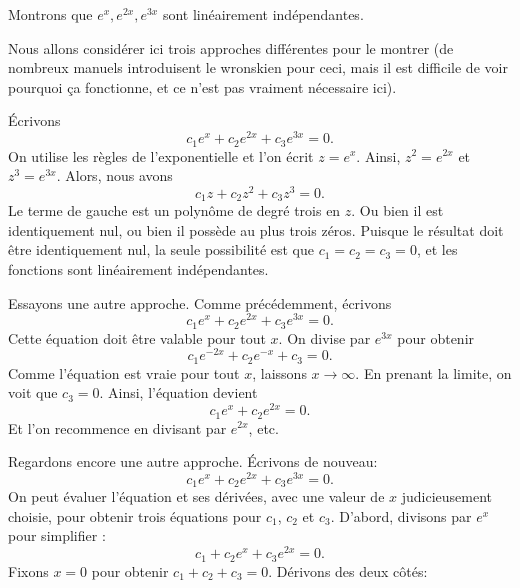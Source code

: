 \begin{example}
	Montrons que $e^x, e^{2x}, e^{3x}$ sont linéairement indépendantes.
	
	Nous allons considérer ici trois approches différentes pour le montrer 
	(de nombreux manuels introduisent le wronskien pour ceci, 
	mais il est difficile de voir pourquoi ça fonctionne, et ce n'est pas vraiment nécessaire ici).
	
	Écrivons
	\begin{equation*}
		c_1 e^x + c_2 e^{2x} + c_3 e^{3x} = 0.
	\end{equation*}
	On utilise les règles de l'exponentielle et l'on écrit $z = e^x$.  
	Ainsi, $z^2 = e^{2x}$ et $z^3 = e^{3x}$.  
	Alors, nous avons
	\begin{equation*}
		c_1 z + c_2 z^2 + c_3 z^3 = 0.
	\end{equation*}
	Le terme de gauche est un polynôme de degré trois en $z$.
	Ou bien il est identiquement nul, ou bien il possède au plus trois zéros. 
	Puisque le résultat doit être identiquement nul, la seule possibilité est que 
	$c_1 = c_2 = c_3 = 0$, et les fonctions sont linéairement indépendantes. 
	
	Essayons une autre approche. Comme précédemment, écrivons 
	\begin{equation*}
		c_1 e^x + c_2 e^{2x} + c_3 e^{3x} = 0.
	\end{equation*}
	Cette équation doit être valable pour tout $x$.  On divise par  $e^{3x}$ pour obtenir
	\begin{equation*}
		c_1 e^{-2x} + c_2 e^{-x} + c_3 = 0.
	\end{equation*}
	Comme l'équation est vraie pour tout $x$, laissons $x \to \infty$.  En prenant la limite, on voit que $c_3 = 0$.  Ainsi, l'équation devient 
	\begin{equation*}
		c_1 e^x + c_2 e^{2x} = 0.
	\end{equation*}
	Et l'on recommence en divisant par $e^{2x}$, etc.
	
	Regardons encore une autre approche. Écrivons de nouveau:  
	\begin{equation*}
		c_1 e^x + c_2 e^{2x} + c_3 e^{3x} = 0.
	\end{equation*}
	On peut évaluer l'équation et ses dérivées, avec une valeur de $x$ judicieusement choisie, pour obtenir trois équations pour 
	$c_1$, $c_2$ et $c_3$.
	D'abord, divisons par $e^{x}$ pour simplifier :
	\begin{equation*}
		c_1 + c_2 e^{x} + c_3 e^{2x} = 0.
	\end{equation*}
	Fixons $x=0$ pour obtenir $c_1 + c_2 + c_3 = 0$.  Dérivons des deux côtés: 
	

\end{example}
